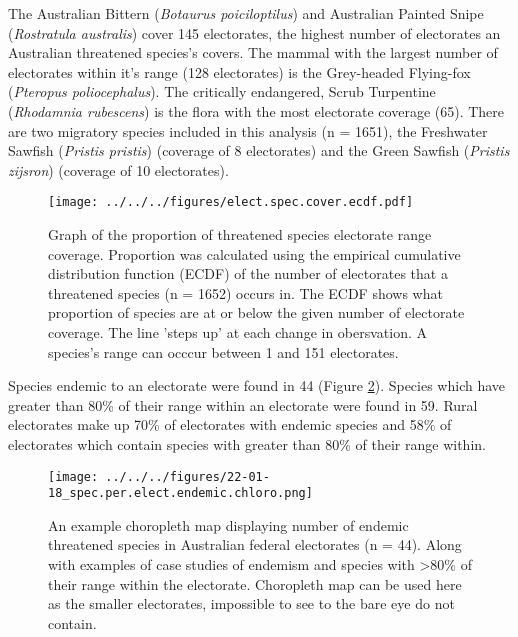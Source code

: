 \documentclass[a4paper,11pt]{article}
\begin{document}
The Australian Bittern (\emph{Botaurus poiciloptilus}) and Australian Painted Snipe (\emph{Rostratula australis}) cover 145 electorates, the highest number of electorates an Australian threatened species's covers. The mammal with the largest number of electorates within it's range (128 electorates) is the Grey-headed Flying-fox (\emph{Pteropus poliocephalus}). The critically endangered, Scrub Turpentine (\emph{Rhodamnia rubescens}) is the flora with the most electorate coverage (65).
There are two migratory species included in this analysis (n = 1651), the Freshwater Sawfish (\emph{Pristis pristis}) (coverage of 8 electorates) and the Green Sawfish (\emph{Pristis zijsron}) (coverage of 10 electorates).



\begin{figure}[H]
	\centering
    \texttt{[image: ../../../figures/elect.spec.cover.ecdf.pdf]}
    \caption{Graph of the proportion of threatened species electorate range coverage. Proportion was calculated using the empirical cumulative distribution function (ECDF) of the number of electorates that a threatened species (n = 1652) occurs in. The ECDF shows what proportion of species are at or below the given number of electorate coverage. The line 'steps up' at each change in obersvation. A species's range can occcur between 1 and 151 electorates.}
    \label{fig:hist}
\end{figure}

Species endemic to an electorate were found in 44 (Figure \ref{fig:endemic_chloro}). Species which have greater than 80\% of their range within an electorate were found in 59. Rural electorates make up 70\% of electorates with endemic species and 58\% of electorates which contain species with greater than 80\% of their range within.

\begin{figure}[H]
	\centering
    \texttt{[image: ../../../figures/22-01-18\_spec.per.elect.endemic.chloro.png]}
    \caption{An example choropleth map displaying number of endemic threatened species in Australian federal electorates (n = 44). Along with examples of case studies of endemism and species with >80\% of their range within the electorate. Choropleth map can be used here as the smaller electorates, impossible to see to the bare eye do not contain.}
    \label{fig:endemic_chloro}
\end{figure}
\end{document}
